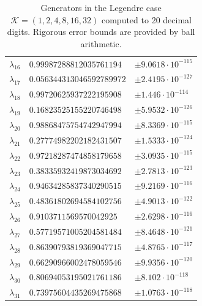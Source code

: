 \documentclass[a4paper,10pt]{article}
\begin{document}
\begin{appendix}
\begin{table}[h]
\begin{tabular}{|l|ll|}
  $\lambda_{16}$ & $0.99987288812035761194$  &  $\pm 9.0618 \cdot 10^{-115}$ \\
  $\lambda_{17}$ & $0.056344313046592789972$ &  $\pm 2.4195 \cdot 10^{-127}$ \\
  $\lambda_{18}$ & $0.99720625937222195908$  &  $\pm 1.446 \cdot 10^{-114}$ \\
  $\lambda_{19}$ & $0.16823525155220746498$  &  $\pm 5.9532 \cdot 10^{-126}$ \\
  $\lambda_{20}$ & $0.98868475754742947994$  &  $\pm 8.3369 \cdot 10^{-115}$ \\
  $\lambda_{21}$ & $0.27774982202182431507$  &  $\pm 1.5333 \cdot 10^{-124}$ \\
  $\lambda_{22}$ & $0.97218287474858179658$  &  $\pm 3.0935 \cdot 10^{-115}$ \\
  $\lambda_{23}$ & $0.38335932419873034692$  &  $\pm 2.7813 \cdot 10^{-123}$ \\
  $\lambda_{24}$ & $0.94634285837340290515$  &  $\pm 9.2169 \cdot 10^{-116}$ \\
  $\lambda_{25}$ & $0.48361802694584102756$  &  $\pm 4.9013 \cdot 10^{-122}$ \\
  $\lambda_{26}$ & $0.9103711569570042925$   &  $\pm 2.6298 \cdot 10^{-116}$ \\
  $\lambda_{27}$ & $0.57719571005204581484$  &  $\pm 8.4648 \cdot 10^{-121}$ \\
  $\lambda_{28}$ & $0.86390793819369047715$  &  $\pm 4.8765 \cdot 10^{-117}$ \\
  $\lambda_{29}$ & $0.66290966002478059546$  &  $\pm 9.9356 \cdot 10^{-120}$ \\
  $\lambda_{30}$ & $0.80694053195021761186$  &  $\pm 8.102 \cdot 10^{-118}$ \\
  $\lambda_{31}$ & $0.73975604435269475868$  &  $\pm 1.0763 \cdot 10^{-118}$ \\
  \hline
  \end{tabular}
  \caption{Generators in the Legendre case $\mathcal{K} = (1,2,4,8,16,32)$
  computed to 20 decimal digits. Rigorous error bounds are provided by ball
  arithmetic.}
\end{table}


\end{appendix}
\end{document}

